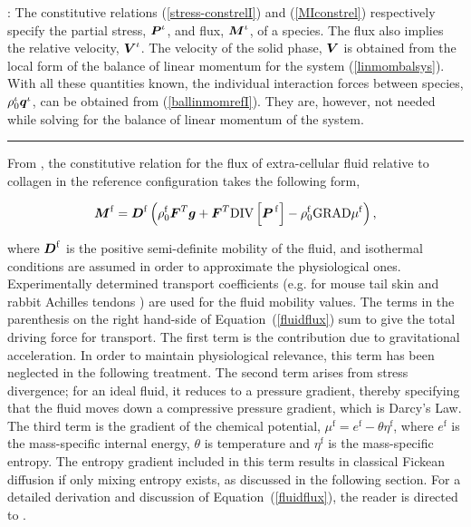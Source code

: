 : The constitutive relations
(\ref{stress-constrelI}) and (\ref{MIconstrel}) respectively
specify the partial stress, $\mbox{\boldmath$ P$}^\iota$, and flux, $\mbox{\boldmath$ M$}^\iota$, of
a species. The flux also implies the relative velocity,
$\mbox{\boldmath$ V$}^\iota$. The velocity of the solid phase, $\mbox{\boldmath$ V$}$ is obtained
from the local form of the balance of linear momentum for the
system (\ref{linmombalsys}). With all these quantities known, the
individual interaction forces between species,
$\rho^\iota_0\mbox{\boldmath$ q$}^\iota$, can be obtained from
(\ref{ballinmomrefI}). They are, however, not needed while solving
for the balance of linear momentum of the system.

\hrule

From \citet{growthpaper}, the constitutive relation for the flux of 
extra-cellular fluid relative to collagen in the reference
configuration takes the following form,

\begin{equation}
\mbox{\boldmath$ M$}^\mathrm{f} = \mbox{\boldmath$ D$}^\mathrm{f}\left(\rho_0^\mathrm{f}\mbox{\boldmath$ F$}^T\mbox{\boldmath$ g$} +
      \mbox{\boldmath$ F$}^T\mathrm{\small{DIV}}\left[\mbox{\boldmath$ P$}^{\,\mathrm{f}}\right] -
      \rho_0^\mathrm{f}\mathrm{\small{GRAD}}\mu^\mathrm{f}\right),
\label{fluidflux}
\end{equation}

\noindent where $\mbox{\boldmath$ D$}^\mathrm{f}$ is the positive semi-definite
mobility of the fluid, and isothermal conditions are assumed in order to
approximate the physiological ones. Experimentally determined
transport coefficients (e.g. for mouse tail skin \citep{Swartzetal:99}
and rabbit Achilles tendons \citep{Hanetal:2000}) are used for the
fluid mobility values. The terms in the parenthesis on the right
hand-side of \mbox{Equation (\ref{fluidflux})} sum to give the
total driving force for transport. The first term is the contribution
due to gravitational acceleration. In order to maintain physiological
relevance, this term has been neglected in the following
treatment. The second term arises from stress divergence; for an ideal
fluid, it reduces to a pressure gradient, thereby specifying that the
fluid moves down a compressive pressure gradient, which is Darcy's
Law. The third term is the gradient of the chemical
potential, $\mu^\mathrm{f} = e^\mathrm{f} - \theta \eta^\mathrm{f}$,
where $e^\mathrm{f}$ is the mass-specific internal energy, $\theta$ is
temperature and $\eta^\mathrm{f}$ is the mass-specific entropy. The
entropy gradient included in this term results in 
classical Fickean diffusion if only mixing entropy exists, as
discussed in the following section. For a
detailed derivation and discussion of \mbox{Equation
(\ref{fluidflux})}, the reader is directed to \citet{growthpaper}.

